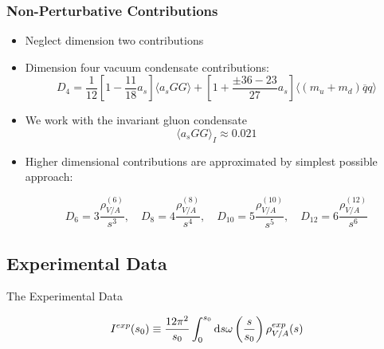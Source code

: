 \documentclass{beamer}
\begin{document}
\begin{frame}
  \frametitle{Non-Perturbative Contributions}
  \begin{itemize}
  \item Neglect dimension two contributions
  \item Dimension four vacuum condensate contributions:
    \begin{equation}
      D_{4} = \frac{1}{12}\left[ 1 - \frac{11}{18}a_s \right] \langle  a_s GG \rangle
      + \left[ 1 + \frac{\pm 36 - 23}{27} a_s \right] \langle (m_u + m_d) \overline{q}q \rangle
    \end{equation}
  \item We work with the invariant gluon condensate
    \begin{equation}
      \langle a_s GG \rangle_I \approx 0.021
    \end{equation}
  \item Higher dimensional contributions are approximated by simplest possible
    approach:
    \begin{small}
      \begin{equation}
        D_{6} = 3 \frac{\rho_{V/A}^{(6)}}{s^3}, \quad
        D_{8} = 4 \frac{\rho_{V/A}^{(8)}}{s^4}, \quad
        D_{10} = 5 \frac{\rho_{V/A}^{(10)}}{s^5}, \quad
        D_{12} = 6 \frac{\rho_{V/A}^{(12)}}{s^6}
      \end{equation}
    \end{small}
  \end{itemize}
\end{frame}


\subsection{Experimental Data}
\begin{frame}
  \centering \vspace{0.5cm}
  \begin{LARGE}
    The Experimental Data
  \end{LARGE}
  \begin{equation}
    I^{exp}(s_0) \equiv \frac{12 \pi^2}{s_0} \int_0^{s_0} \dif s \omega\left(\frac{s}{s_0}\right) \rho^{exp}_{V/A}(s)
  \end{equation}
\end{frame}
\end{document}
